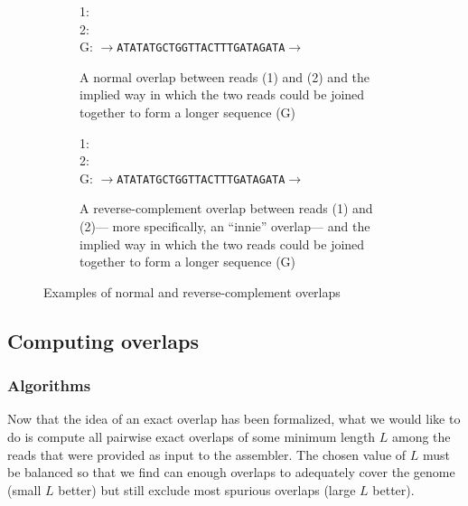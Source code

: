 \documentclass[10pt]{article}
\begin{document}
\begin{figure}
	\centering
	\begin{subfigure}[t]{0.455\textwidth}
		1:  \\
		2:  \\
		G: {\tt $\rightarrow$ATATATGCTGGTTACTTTGATAGATA$\rightarrow$}
		\caption{A normal overlap between reads (1) and (2) and the
		implied way in which the two reads could be joined together to
		form a longer sequence (G)}
	\end{subfigure}
		\hspace{0.07\textwidth}
	\begin{subfigure}[t]{0.455\textwidth}
		1:  \\
		2:  \\
		G: {\tt $\rightarrow$ATATATGCTGGTTACTTTGATAGATA$\rightarrow$}
		\caption{A reverse-complement overlap between reads (1) and
		(2)--- more specifically, an ``innie'' overlap--- and the
		implied way in which the two reads could be joined together to
		form a longer sequence (G)}
	\end{subfigure}
	\caption{Examples of normal and reverse-complement overlaps}
	\label{fig:overlap_examples}
\end{figure}

\subsection{Computing overlaps}

\subsubsection{Algorithms}

Now that the idea of an exact overlap has been formalized, what we would like to
do is compute all pairwise exact overlaps of some minimum length $L$ among the
	reads that were provided as input to the assembler.  The chosen value of $L$
	must be balanced so that we find can enough overlaps to adequately cover the
	genome (small $L$ better) but still exclude most spurious overlaps (large
	$L$ better).
\end{document}
